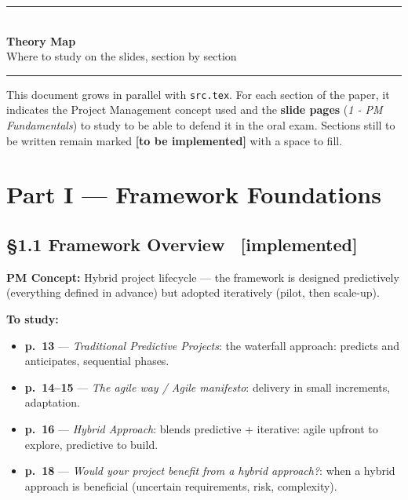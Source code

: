 \documentclass[12pt,a4paper]{article}
\newcommand{\statusdone}{\textcolor{donegreen}{\small\textbf{[implemented]}}}
\newcommand{\statustodo}{\textcolor{alertborder!80!black}{\small\textbf{[to be implemented]}}}
\newcommand{\slide}[3]{\item \textbf{p.~#1} --- \textit{#2}: #3}
\newcommand{\concetto}[1]{\textbf{PM Concept:} #1\par\vspace{2pt}}
\begin{document}
\begin{center}
{\color{accentdark}\rule{\textwidth}{1.5pt}}\\[8pt]
{\LARGE\bfseries\color{accentdark} Theory Map}\\[6pt]
{\large\color{accentdark!80!black} Where to study on the slides, section by section}\\[8pt]
{\color{accentdark}\rule{\textwidth}{1.5pt}}
\end{center}

\vspace{4pt}

\begin{tcolorbox}[
  enhanced, breakable, colback=gray!6, colframe=gray!40, boxrule=0.6pt, arc=2pt,
  left=8pt, right=8pt, top=5pt, bottom=5pt,
]
This document grows in parallel with \texttt{src.tex}. For each section of the paper, it indicates the Project Management concept used and the \textbf{slide pages} (\textit{1 - PM Fundamentals}) to study to be able to defend it in the oral exam. Sections still to be written remain marked \statustodo{} with a space to fill.
\end{tcolorbox}

\tableofcontents
\newpage

\section{Part I --- Framework Foundations}

\subsection{\S1.1 Framework Overview \ \statusdone}
\concetto{Hybrid project lifecycle --- the framework is designed predictively (everything defined in advance) but adopted iteratively (pilot, then scale-up).}
\textbf{To study:}
\begin{itemize}
  \slide{13}{Traditional Predictive Projects}{the waterfall approach: predicts and anticipates, sequential phases.}
  \slide{14--15}{The agile way / Agile manifesto}{delivery in small increments, adaptation.}
  \slide{16}{Hybrid Approach}{blends predictive + iterative: agile upfront to explore, predictive to build.}
  \slide{18}{Would your project benefit from a hybrid approach?}{when a hybrid approach is beneficial (uncertain requirements, risk, complexity).}
\end{itemize}
\end{document}
